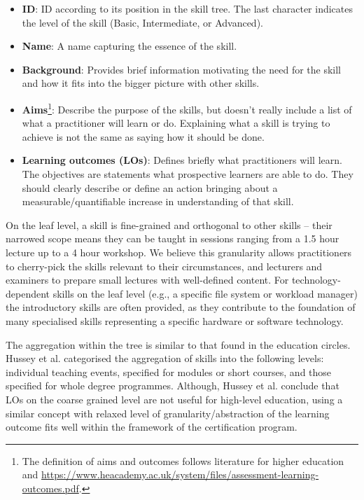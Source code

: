 \documentclass[jocse]{jocseart}
\newcommand{\kh}[1]{\todo[inline]{KH: #1}}
\begin{document}
\begin{itemize}
  \item \textbf{ID}: ID according to its position in the skill tree. The last character indicates the level of the skill (Basic, Intermediate, or Advanced).
  \item \textbf{Name}: A name capturing the essence of the skill.
  \item \textbf{Background}: Provides brief information motivating the need for the skill and how it fits into the bigger picture with other skills.
  \item \textbf{Aims}\footnote{The definition of aims and outcomes follows literature for higher education \cite{williamson2011good} and \url{https://www.heacademy.ac.uk/system/files/assessment-learning-outcomes.pdf}.}:
  Describe the purpose of the skills, but doesn't really include a list of what a practitioner will learn or do. Explaining what a skill is trying to achieve is not the same as saying how it should be done.
  \item \textbf{Learning outcomes (LOs)}: Defines briefly what practitioners will learn.
  The objectives are statements what prospective learners are able to do. They should clearly describe or define an action bringing about a measurable/quantifiable increase in understanding of that skill.
 \end{itemize}

On the leaf level, a skill is fine-grained and orthogonal to other skills -- their narrowed scope means they can be taught in sessions ranging from a 1.5 hour lecture up to a 4 hour workshop.
We believe this granularity allows practitioners to cherry-pick the skills relevant to their circumstances, and lecturers and examiners to prepare small lectures with well-defined content.
For technology-dependent skills on the leaf level (e.g., a specific file system or workload manager) the introductory skills are often provided, as they contribute to the foundation of many specialised skills representing a specific hardware or software technology.

The aggregation within the tree is similar to that found in the education circles. Hussey et al.\cite{hussey2008learning} categorised the aggregation of skills into the following levels: individual teaching events, specified for modules or short courses, and those specified for whole degree programmes.
Although, Hussey et al. conclude that LOs on the coarse grained level are not useful for high-level education, using a similar concept with relaxed level of granularity/abstraction of the learning outcome fits well within the framework of the certification program.
\end{document}
